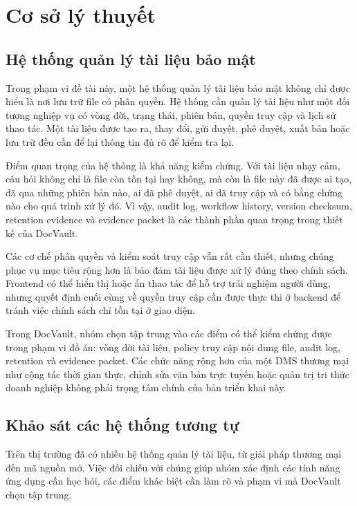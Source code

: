 \chapter{Cơ sở lý thuyết}

\section{Hệ thống quản lý tài liệu bảo mật}

Trong phạm vi đề tài này, một hệ thống quản lý tài liệu bảo mật không chỉ được hiểu là nơi lưu trữ file có phân quyền. Hệ thống cần quản lý tài liệu như một đối tượng nghiệp vụ có vòng đời, trạng thái, phiên bản, quyền truy cập và lịch sử thao tác. Một tài liệu được tạo ra, thay đổi, gửi duyệt, phê duyệt, xuất bản hoặc lưu trữ đều cần để lại thông tin đủ rõ để kiểm tra lại.

Điểm quan trọng của hệ thống là khả năng kiểm chứng. Với tài liệu nhạy cảm, câu hỏi không chỉ là file còn tồn tại hay không, mà còn là file này đã được ai tạo, đã qua những phiên bản nào, ai đã phê duyệt, ai đã truy cập và có bằng chứng nào cho quá trình xử lý đó. Vì vậy, audit log, workflow history, version checksum, retention evidence và evidence packet là các thành phần quan trọng trong thiết kế của DocVault.

Các cơ chế phân quyền và kiểm soát truy cập vẫn rất cần thiết, nhưng chúng phục vụ mục tiêu rộng hơn là bảo đảm tài liệu được xử lý đúng theo chính sách. Frontend có thể hiển thị hoặc ẩn thao tác để hỗ trợ trải nghiệm người dùng, nhưng quyết định cuối cùng về quyền truy cập cần được thực thi ở backend để tránh việc chính sách chỉ tồn tại ở giao diện.

Trong DocVault, nhóm chọn tập trung vào các điểm có thể kiểm chứng được trong phạm vi đồ án: vòng đời tài liệu, policy truy cập nội dung file, audit log, retention và evidence packet. Các chức năng rộng hơn của một DMS thương mại như cộng tác thời gian thực, chỉnh sửa văn bản trực tuyến hoặc quản trị tri thức doanh nghiệp không phải trọng tâm chính của bản triển khai này.

\section{Khảo sát các hệ thống tương tự}

Trên thị trường đã có nhiều hệ thống quản lý tài liệu, từ giải pháp thương mại đến mã nguồn mở. Việc đối chiếu với chúng giúp nhóm xác định các tính năng ứng dụng cần học hỏi, các điểm khác biệt cần làm rõ và phạm vi mà DocVault chọn tập trung.

